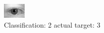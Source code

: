 \begin{figure}[h!]
\begin{center}
\includegraphics[width=0.60\columnwidth]{figures/ID596_class_2_target_3.png}
\end{center}
\caption{ Classification: 2 actual target: 3}
\label{fig:ID596_class_2_target_3}
\end{figure}
